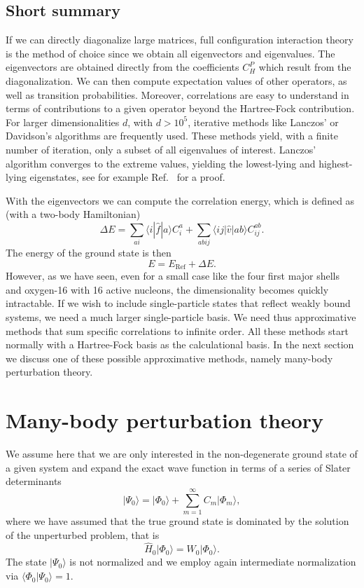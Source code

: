   \subsection{Short summary}


  If we can directly diagonalize large matrices, full configuration interaction
  theory is the method of choice since  we obtain all  eigenvectors and eigenvalues. 
  The eigenvectors are obtained directly from the coefficients
    $C_H^P$ which result from the diagonalization.  We can then
compute expectation values of other operators,
    as well as transition probabilities. Moreover, correlations are easy to understand in terms of contributions
    to a given operator beyond the Hartree-Fock contribution. 
For larger dimensionalities $d$, with $d > 10^5$, iterative methods \cite{golubvanloan} like Lanczos' \cite{lanczos} or Davidson's \cite{davidson1989,davidson1993} 
algorithms are frequently used. These methods yield, with a finite number of iteration, only a subset of all eigenvalues of interest. Lanczos' algorithm converges to the extreme values, yielding the lowest-lying and highest-lying eigenstates, see for example Ref.~\cite{golubvanloan} for a proof. 

With the eigenvectors we can compute
  the correlation energy, which is defined as (with a two-body Hamiltonian)
  \[
  \Delta E=\sum_{ai}\langle i| \hat{f}|a \rangle C_{i}^{a}+
  \sum_{abij}\langle ij | \hat{v}| ab \rangle C_{ij}^{ab}.
  \]
The energy of  the ground state is then
  \[
  E=E_{\mathrm{Ref}}+\Delta E.
  \]
  However, as we have seen, even for a
  small case like the four first major shells and 
  oxygen-16 with 16 active nucleons, the dimensionality becomes quickly intractable. If we
  wish to include single-particle states that reflect weakly bound
  systems, we need a much larger single-particle basis. We need thus
  approximative methods that sum specific correlations to infinite
  order.  All these methods start normally with a Hartree-Fock basis
  as the calculational basis. In the next section we discuss one of
  these possible approximative methods, namely many-body perturbation
  theory.

  \section{Many-body perturbation theory}\label{sec:chap8mbpt}

  We assume here that we are only interested in the non-degenerate
  ground state of a given system and expand the exact wave function in
  terms of a series of Slater determinants
  \[
  \vert \Psi_0\rangle = \vert \Phi_0\rangle +
  \sum_{m=1}^{\infty}C_m\vert \Phi_m\rangle,
  \]
  where we have assumed that the true ground state is dominated by the
  solution of the unperturbed problem, that is
  \[
  \hat{H}_0\vert \Phi_0\rangle= W_0\vert \Phi_0\rangle.
  \]
  The state $\vert \Psi_0\rangle$ is not normalized and we employ again
  intermediate normalization via $\langle \Phi_0 \vert
  \Psi_0\rangle=1$.

